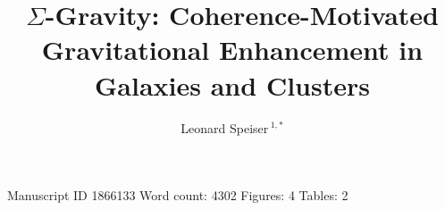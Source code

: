 \documentclass[utf8]{FrontiersinHarvard}
\def\firstAuthorLast{Speiser}
\def\Authors{Leonard Speiser\,$^{1,*}$}
\begin{document}
\onecolumn
{}
\title[$\Sigma$-Gravity]{$\Sigma$-Gravity: Coherence-Motivated Gravitational Enhancement in Galaxies and Clusters}
\author[\firstAuthorLast]{\Authors}
\address{}
\correspondance{}
\extraAuth{}
\maketitle

\begin{center}
\small Manuscript ID 1866133 \quad Word count: 4302 \quad Figures: 4 \quad Tables: 2
\end{center}

\begin{abstract}
\section{}

\end{abstract}
\end{document}
